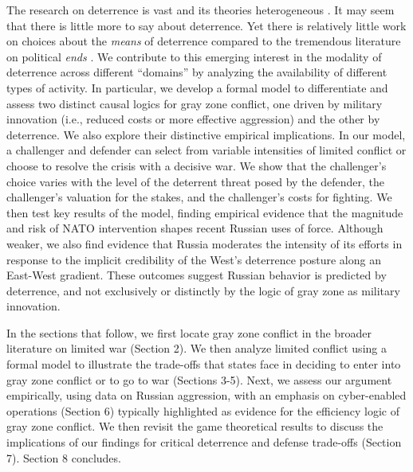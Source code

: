 \documentclass[11pt,letterpaper,pdftex,dvipsnames,table]{article}
\begin{document}
The research on deterrence is vast and its theories heterogeneous \citep{huth_deterrenceinternationalconflict_1999, freedman_deterrence_2004, danilovic_deterrencecrisisbargaining_2010, quackenbush_deterrencetheorywhere_2011}. It may seem that there is little more to say about deterrence. Yet there is relatively little work on choices about the \textit{means} of deterrence compared to the tremendous literature on political \textit{ends}  \citep{carcelli_diversificationdeterrencenew_2017, lindsay_crossdomaindeterrencestrategy_2019}. We contribute to this emerging interest in the modality of deterrence across different ``domains'' by analyzing the availability of different types of activity. In particular, we develop a formal model to differentiate and assess two distinct causal logics for gray zone conflict, one driven by military innovation (i.e., reduced costs or more effective aggression) and the other by deterrence. We also explore their distinctive empirical implications. In our model, a challenger and defender can select from variable intensities of limited conflict or choose to resolve the crisis with a decisive war. We show that the challenger's choice varies with the level of the deterrent threat posed by the defender, the challenger's valuation for the stakes, and the challenger's costs for fighting. We then test key results of the model, finding empirical evidence that the magnitude and risk of NATO intervention shapes recent Russian uses of force. Although weaker, we also find evidence that Russia moderates the intensity of its efforts in response to the implicit credibility of the West's deterrence posture along an East-West gradient. These outcomes suggest Russian behavior is predicted by deterrence, and not exclusively or distinctly by the logic of gray zone as military innovation. 

In the sections that follow, we first locate gray zone conflict in the broader literature on limited war (Section 2). We then analyze limited conflict using a formal model to illustrate the trade-offs that states face in deciding to enter into gray zone conflict or to go to war (Sections 3-5). Next, we assess our argument empirically, using data on Russian aggression, with an emphasis on cyber-enabled operations (Section 6) typically highlighted as evidence for the efficiency logic of gray zone conflict. We then revisit the game theoretical results to discuss the implications of our findings for critical deterrence and defense trade-offs (Section 7). Section 8 concludes.
\end{document}
